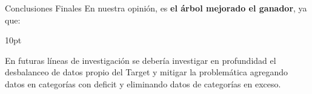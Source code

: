\documentclass[pdf]{beamer}
\def\vspace{}%
\begin{document}
{\begin{frame}{Conclusiones Finales}
    En nuestra opinión, es \textbf{el árbol mejorado el ganador}, ya que:
    \begin{itemize}
    \end{itemize}
    \vspace{10pt} 

    En futuras líneas de investigación se debería investigar en profundidad el desbalanceo de datos propio del Target y mitigar la problemática agregando datos en categorías con deficit y eliminando datos de categorías en exceso.

\end{frame}
}
\end{document}
